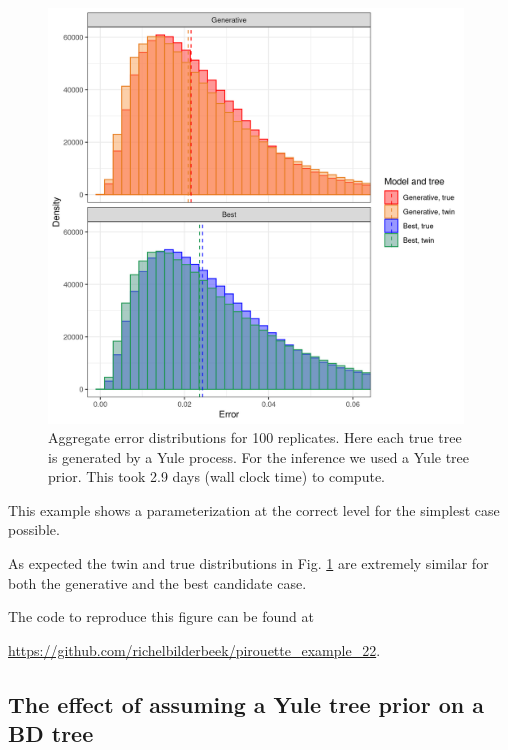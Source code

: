 \begin{figure}[H]
  \includegraphics[width=0.98\textwidth]{pirouette_example_22/errors.png}
  \caption{Aggregate error distributions for 100 replicates. 
    Here each true tree is generated by a Yule process. 
    For the inference we used a Yule tree prior. 
    This took 2.9 days (wall clock time) to compute.}
  \label{fig:example_yule}
\end{figure}

This example shows a parameterization at the correct level for the
simplest case possible.

As expected the twin and true distributions in Fig. \ref{fig:example_yule} 
are extremely similar for both the generative and the best candidate case.

The code to reproduce this figure can be found at  
\begin{sloppypar}
  \url{https://github.com/richelbilderbeek/pirouette_example_22}.
\end{sloppypar}

\newpage

\subsection{The effect of assuming a Yule tree prior on a BD tree}
\label{subsec:under_parameterization}

